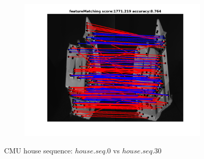 \documentclass[
	fontsize=12pt,
	paper=a4,
	twoside=false,
	numbers=noenddot,
	plainheadsepline,
	toc=listof,
	toc=bibliography
]{scrartcl}
\begin{document}
\begin{figure}[h]
\begin{subfigure}[b]{0.3\textwidth}
		\includegraphics[scale=0.25]{"fig_ver2608/RealImages/HouseSeq/anchor_descr/using_cpd_afftrafo/solution/fi_4_featureMatching"}  
	\end{subfigure} 		
	\caption{CMU house sequence: $house.seq.0$ vs $house.seq.30$}
\end{figure}
\vspace{-20pt}
\end{document}

